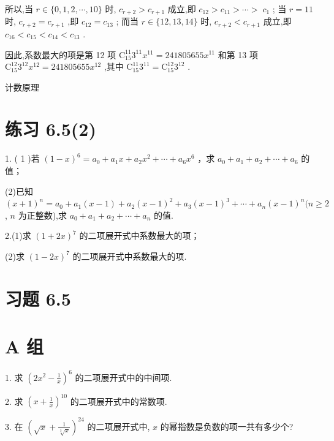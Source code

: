 \documentclass[10pt]{article}
\begin{document}
所以,当 \(r \in  \{ 0,1,2,\cdots ,{10}\}\) 时, \({c}_{r + 2} > {c}_{r + 1}\) 成立,即 \({c}_{12} > {c}_{11} > \cdots  > \; {c}_{1}\) ; 当 \(r = {11}\) 时, \({c}_{r + 2} = {c}_{r + 1}\) ,即 \({c}_{12} = {c}_{13}\) ; 而当 \(r \in  \{ {12},{13},{14}\}\) 时, \({c}_{r + 2} < {c}_{r + 1}\) 成立,即 \({c}_{16} < {c}_{15} < {c}_{14} < {c}_{13}\) .

因此,系数最大的项是第 12 项 \({\mathrm{C}}_{15}^{11}{3}^{11}{x}^{11} = {241805655}{x}^{11}\) 和第 13 项 \({\mathrm{C}}_{15}^{12}{3}^{12}{x}^{12} = {241805655}{x}^{12}\) ,其中 \({\mathrm{C}}_{15}^{11}{3}^{11} = {\mathrm{C}}_{15}^{12}{3}^{12}\) .





计数原理

\section*{练习 6.5(2)}

1. ( 1 )若 \({\left( 1 - x\right) }^{6} = {a}_{0} + {a}_{1}x + {a}_{2}{x}^{2} + \cdots  + {a}_{6}{x}^{6}\) ，求 \({a}_{0} + {a}_{1} + {a}_{2} + \cdots  + {a}_{6}\) 的值；

(2)已知 \({\left( x + 1\right) }^{n} = {a}_{0} + {a}_{1}\left( {x - 1}\right)  + {a}_{2}{\left( x - 1\right) }^{2} + {a}_{3}{\left( x - 1\right) }^{3} + \cdots  + {a}_{n}{\left( x - 1\right) }^{n}(n \geq  2\) , \(n\) 为正整数),求 \({a}_{0} + {a}_{1} + {a}_{2} + \cdots  + {a}_{n}\) 的值.

2.(1)求 \({\left( 1 + 2x\right) }^{7}\) 的二项展开式中系数最大的项；

(2)求 \({\left( 1 - 2x\right) }^{7}\) 的二项展开式中系数最大的项.

\section*{习题 6.5}

\section*{A 组}

1. 求 \({\left( 2{x}^{2} - \frac{1}{x}\right) }^{6}\) 的二项展开式中的中间项.

2. 求 \({\left( x + \frac{1}{x}\right) }^{10}\) 的二项展开式中的常数项.

3. 在 \({\left( \sqrt{x} + \frac{1}{\sqrt[3]{x}}\right) }^{24}\) 的二项展开式中, \(x\) 的幂指数是负数的项一共有多少个?
\end{document}
